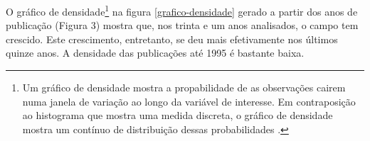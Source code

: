 \documentclass[a4paper, 12pt, openright, oneside, german, french, english, brazil]{abntex2}
\begin{document}
























	O gráfico de densidade\footnote{Um gráfico de densidade mostra a propabilidade de as observações cairem numa janela de variação ao longo da variável de interesse. Em contraposição ao histograma que mostra uma medida discreta, o gráfico de densidade mostra um contínuo de distribuição dessas probabilidades \cite{lander2014r}.} na figura \ref{grafico-densidade} gerado a partir dos anos de publicação (Figura 3) mostra que, nos trinta e um anos analisados, o campo tem crescido. Este crescimento, entretanto, se deu mais efetivamente nos últimos quinze anos. A densidade das publicações até 1995 é bastante baixa.
\end{document}
